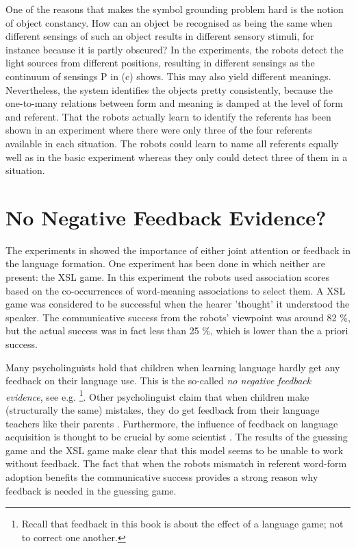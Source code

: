 One of the reasons that makes the symbol grounding problem hard is the notion of object constancy. How can an object be recognised as being the same when different sensings of such an object results in different sensory stimuli, for instance because it is partly obscured? In the experiments, the robots detect the light sources from different positions, resulting in different sensings as the continuum of sensings P in  (c) shows. This may also yield different meanings. Nevertheless, the system identifies the objects pretty consistently, because the one-to-many relations between form and meaning is damped at the level of form and referent. That the robots actually learn to identify the referents has been shown in an experiment where there were only three of the four referents available in each situation. The robots could learn to name all referents equally well as in the basic experiment whereas they only could detect three of them in a situation.



\section{No Negative Feedback Evidence?}\label{s:disc:feed}

The experiments in  showed the importance of either joint attention or feedback in the language formation. One experiment has been done in which neither are present: the XSL game. In this experiment the robots used association scores based on the co-occurrences of word-meaning associations to select them. A XSL game was considered to be successful when the hearer 'thought' it understood the speaker. The communicative success from the robots' viewpoint was around 82 \%, but the actual success was in fact less than 25 \%, which is lower than the a priori success. 


Many psycholinguists hold that children when learning language hardly get any feedback on their language use. This is the so-called {\em no negative feedback evidence}, see e.g. \citep{braine:1971,bowerman:1988}\footnote{Recall that feedback in this book is about the effect of a language game; not to correct one another.}. Other psycholinguist claim that when children make (structurally the same) mistakes, they do get feedback from their language teachers like their parents \citep{demetrasetal:1986}. Furthermore, the influence of feedback on language acquisition is thought to be crucial by some scientist \citep{clancey:1997,demetrasetal:1986,clarkclark:1977,tomasellobarton:1994}. The results of the guessing game and the XSL game make clear that this model seems to be unable to work without feedback. The fact that when the robots mismatch in referent word-form adoption benefits the communicative success provides a strong reason why feedback is needed in the guessing game. 

